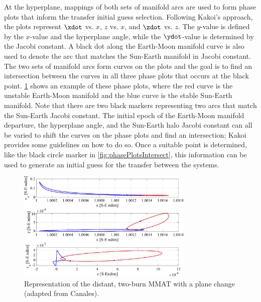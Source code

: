 At the hyperplane, mappings of both sets of manifold arcs are used to form phase plots that inform
the transfer initial guess selection. Following Kakoi's approach, the plots represent $\xdot$ vs.
$x$, $z$ vs. $x$, and $\zdot$ vs. $z$. The $y$-value is defined by the $x$-value and the hyperplane
angle, while the $\ydot$-value is determined by the Jacobi constant\cite{Kakoi:2015}. A black dot
along the Earth-Moon manifold curve is also used to denote the arc that matches the Sun-Earth
manifold in Jacobi constant. The two sets of manifold arcs form curves on the plots and the goal is
to find an intersection between the curves in all three phase plots that occurs at the black point.
\cref{fig:phasePlots} shows an example of these phase plots, where the red curve is the unstable
Earth-Moon manifold and the blue curve is the stable Sun-Earth manifold. Note that there are two
black markers representing two arcs that match the Sun-Earth Jacobi constant. The initial epoch of
the Earth-Moon manifold departure, the hyperplane angle, and the Sun-Earth halo Jacobi constant can
all be varied to shift the curves on the phase plots and find an intersection; Kakoi provides some
guidelines on how to do so\cite{Kakoi:2015}. Once a suitable point is determined, like the black
circle marker in \cref{fig:phasePlotsIntersect}, this information can be used to generate an
initial guess for the transfer between the systems.

\begin{figure}[ht]
    \centering
    \includegraphics[width=0.75\textwidth]{figures/PhasePlots.pdf}
    \caption{Representation of the distant, two-burn MMAT with a plane change (adapted from Canales\cite{Canales:2021b}).}
    \label{fig:phasePlots}
\end{figure}

